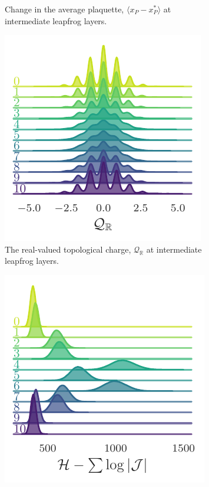 \documentclass{article} %
\begin{document}
\begin{figure}[htpb]
\begin{subfigure}{0.31\textwidth}
      \caption{\label{fig:plaqsf}Change in the average plaquette, \(\langle x_{P}-x_{P}^{*}\rangle\) at intermediate leapfrog layers.}
   \end{subfigure}
   \hfill
   \begin{subfigure}{0.31\textwidth}
      \includegraphics[width=\textwidth]{figures/sinQf_1755.pdf}
      \caption{\label{fig:sinQf}The real-valued topological charge, \(\mathcal{Q}_{\mathbb{R}}\) at intermediate leapfrog layers.}%
   \end{subfigure}
   \hfill
   \begin{subfigure}{0.31\textwidth}
      \includegraphics[width=\textwidth]{figures/extras/hwf.pdf}

\end{subfigure}
\end{figure}
\end{document}
